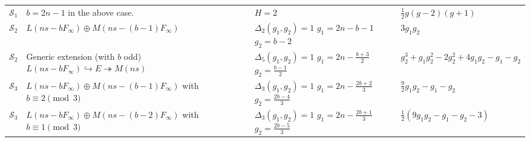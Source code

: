 \documentclass{amsart}
\newcommand{\into}{{\hookrightarrow}}
\newcommand{\onto}{\twoheadrightarrow}
\newcommand{\orb}[1]{{\mathcal #1}}     %
\begin{document}
\begin{longtable}{| l | p{} | p{} |                     p{} |}
$\orb S_1$ &
$b = 2n -1$ in the above case.
&
$H = 2$&
$\frac{1}{2}g(g-2)(g+1)$
\\

$\orb S_2$ &
$L(ns - bF_\infty) \oplus M(ns-(b-1)F_\infty)$ &
$\Delta_2(g_1,g_2) = 1$\newline
$g_1 = 2n-b-1$\newline
$g_2 = b - 2$&
$3g_1g_2$
\\

$\orb S_2$ &
Generic extension (with $b$ odd)\newline
$L(ns - bF_\infty) \into E \onto M(ns)$ &
$\Delta_5(g_1,g_2) = 1$\newline
$g_1 = 2n-\frac{b+3}{2}$\newline
$g_2 = \frac{b - 1}{2}$ &
$g_2^3+g_1g_2^2-2g_2^2+4g_1g_2-g_1-g_2$
\\

$\orb S_3$ &
$L(ns - bF_\infty) \oplus M(ns-(b-1)F_\infty)$\newline
with $b \equiv 2 \pmod 3$&
$\Delta_3(g_1,g_2) = 1$\newline
$g_1 = 2n-\frac{2b+2}{3}$\newline
$g_2 = \frac{2b - 4}{3}$&
$\frac{9}{2}g_1g_2-g_1-g_2$
\\

$\orb S_3$ &
$L(ns - bF_\infty) \oplus M(ns-(b-2)F_\infty)$\newline
with $b \equiv 1 \pmod 3$&
$\Delta_3(g_1,g_2) = 1$\newline
$g_1 = 2n-\frac{2b+1}{3}$\newline
$g_2 = \frac{2b - 5}{3}$&
$\frac{1}{2}(9g_1g_2-g_1-g_2-3)$
\label{table:test-curves-mu}
\end{longtable}
\end{document}
